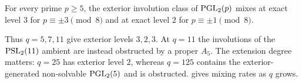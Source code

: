 \begin{corollary}
\label{cor:rankone-prime}
For every prime $p\ge5$, the exterior involution class of $\operatorname{PGL}_2(p)$ mixes
at exact level $3$ for $p\equiv\pm3\pmod8$ and at exact level $2$ for
$p\equiv\pm1\pmod8$.
\end{corollary}

Thus $q=5,7,11$ give exterior levels $3,2,3$. At $q=11$ the involutions
of the $\operatorname{PSL}_2(11)$ ambient are instead obstructed by a proper $A_5$.
The extension degree matters: $q=25$ has exterior level $2$, whereas
$q=125$ contains the exterior-generated non-solvable $\operatorname{PGL}_2(5)$ and is
obstructed.  gives mixing rates as $q$ grows.
